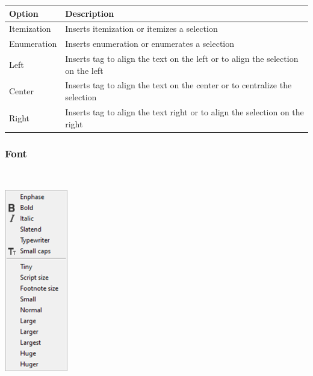 \begin{scriptsize}\begin{tabularx}{\textwidth}{>{\hsize=0.2\hsize}X>{\hsize=0.8\hsize}X}\\
    \hline
    \textbf{Option} & \textbf{Description} \\
    \hline
    Itemization & Inserts itemization or itemizes a selection \\
    Enumeration & Inserts enumeration or enumerates a selection \\
    Left & Inserts tag to align the text on the left or to align the selection on the left \\
    Center & Inserts tag to align the text on the center or to centralize the selection \\
    Right & Inserts tag to align the text right or to align the selection on the right \\
    \hline
  \end{tabularx}\end{scriptsize}


\newpage
\hypertarget{menu_insert_latex_font}{}
\subsubsection{Font}\\

\includegraphics[scale=0.50]{./res/menu_insert_latex_font.png}\\


